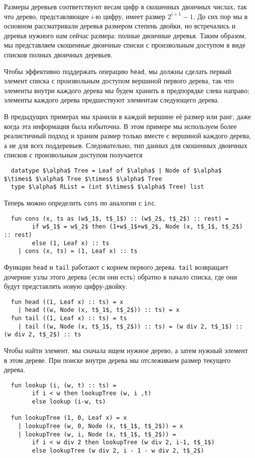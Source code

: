 Размеры деревьев соответствуют весам цифр в скошенных двоичных числах,
так что дерево, представляющее $i$-ю цифру, имеет размер $2^{i+1} -
1$. До сих пор мы в основном рассматривали деревья размером степень
двойки, но встречались и деревья нужного нам сейчас размера: полные
двоичные деревья. Таким образом, мы представляем скошенные двоичные
списки с произвольным доступом в виде списков полных двоичных
деревьев.

Чтобы эффективно поддержать операцию \lstinline!head!, мы должны
сделать первый элемент списка с произвольным доступом вершиной первого
дерева, так что элементы внутри каждого дерева мы будем хранить в
предпорядке слева направо; элементы каждого дерева предшествуют
элементам следующего дерева.

В предыдущих примерах мы хранили в каждой вершине её размер или ранг,
даже когда эта информация была избыточна. В этом примере мы используем
более реалистичный подход и храним размер только вместе с вершиной
каждого дерева, а не для всех поддеревьев. Следовательно, тип данных
для скошенных двоичных списков с произвольным доступом получается
\begin{lstlisting}
  datatype $\alpha$ Tree = Leaf of $\alpha$ | Node of $\alpha$ $\times$ $\alpha$ Tree $\times$ $\alpha$ Tree
  type $\alpha$ RList = (int $\times$ $\alpha$ Tree) list
\end{lstlisting}
Теперь можно определить \lstinline!cons! по аналогии с
\lstinline!inc!.
\begin{lstlisting}
  fun cons (x, ts as (w$_1$, t$_1$) :: (w$_2$, t$_2$) :: rest) =
        if w$_1$ = w$_2$ then (1+w$_1$+w$_2$, Node (x, t$_1$, t$_2$) :: rest)
        else (1, Leaf x) :: ts
    | cons (x, ts) = (1, Leaf x) :: ts
\end{lstlisting}
Функции \lstinline!head! и \lstinline!tail! работают с корнем первого
дерева. \lstinline!tail! возвращает дочерние узлы этого дерева (если
они есть) обратно в начало списка, где они будут представлять новую
цифру-двойку.
\begin{lstlisting}
  fun head ((1, Leaf x) :: ts) = x
    | head ((w, Node (x, t$_1$, t$_2$)) :: ts) = x
  fun tail ((1, Leaf x) :: ts) = ts
    | tail ((w, Node (x, t$_1$, t$_2$)) :: ts) = (w div 2, t$_1$) :: (w div 2, t$_2$) :: ts
\end{lstlisting}
Чтобы найти элемент, мы сначала ищем нужное дерево, а затем нужный
элемент в этом дереве. При поиске внутри дерева мы отслеживаем размер
текущего дерева.
\begin{lstlisting}
  fun lookup (i, (w, t) :: ts) = 
        if i < w then lookupTree (w, i ,t)
        else lookup (i-w, ts)

  fun lookupTree (1, 0, Leaf x) = x
    | lookupTree (w, 0, Node (x, t$_1$, t$_2$)) = x
    | lookupTree (w, i, Node (x, t$_1$, t$_2$)) =
        if i < w div 2 then lookupTree (w div 2, i-1, t$_1$)
        else lookupTree (w div 2, i - 1 - w div 2, t$_2$)
\end{lstlisting}
